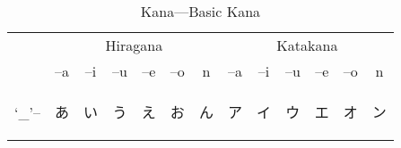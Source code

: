 

\begin{table}[H]
	\centering
	\label{t1}
	\caption{Kana---Basic Kana }
	\begin{tabular}{l|cccccc|cccccc}
		\toprule
          & \multicolumn{6}{c|}{Hiragana} & \multicolumn{6}{c}{Katakana} \\
	      & --a & --i & --u & --e & --o & n & --a & --i & --u & --e & --o & n \\
		\midrule
        `\_'-- & {\begin{CJK}{UTF8}{min} あ \end{CJK}} & {\begin{CJK}{UTF8}{min} い \end{CJK}} & {\begin{CJK}{UTF8}{min} う \end{CJK}} & {\begin{CJK}{UTF8}{min} え \end{CJK}} & {\begin{CJK}{UTF8}{min} お \end{CJK}} & {\begin{CJK}{UTF8}{min} ん \end{CJK}} & {\begin{CJK}{UTF8}{min} ア \end{CJK}} & {\begin{CJK}{UTF8}{min} イ \end{CJK}} & {\begin{CJK}{UTF8}{min} ウ \end{CJK}} & {\begin{CJK}{UTF8}{min} エ \end{CJK}} & {\begin{CJK}{UTF8}{min} オ \end{CJK}} & {\begin{CJK}{UTF8}{min} ン \end{CJK}} \\

\end{tabular}
\end{table}
